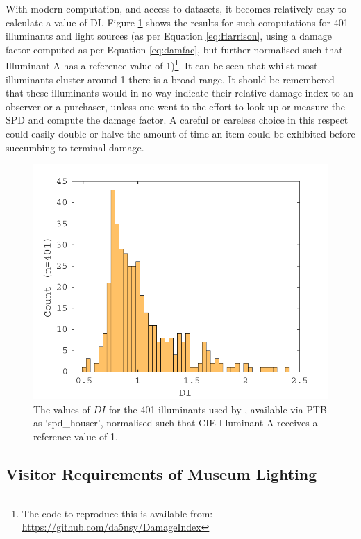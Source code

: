 With modern computation, and access to datasets, it becomes relatively easy to calculate a value of \Gls{DI}. Figure \ref{fig:Houser} shows the results for such computations for 401 illuminants and light sources (as per Equation \ref{eq:Harrison}, using a damage factor computed as per Equation \ref{eq:damfac}, but further normalised such that Illuminant A has a reference value of 1)\footnote{The code to reproduce this is available from: \url{https://github.com/da5nsy/DamageIndex}}. It can be seen that whilst most illuminants cluster around 1 there is a broad range. It should be remembered that these illuminants would in no way indicate their relative damage index to an observer or a purchaser, unless one went to the effort to look up or measure the \gls{SPD} and compute the damage factor. A careful or careless choice in this respect could easily double or halve the amount of time an item could be exhibited before succumbing to terminal damage.

\begin{figure}[htbp]
\includegraphics[max width=\textwidth]{figs/LitRev/DI.pdf}
\caption{The values of $DI$ for the 401 illuminants used by \citet{houser_review_2013}, available via \gls{PTB} as `spd\_houser', normalised such that \gls{CIE} Illuminant A receives a reference value of 1.}
\label{fig:Houser}
\end{figure}


\clearpage
\subsection{Visitor Requirements of Museum Lighting}

